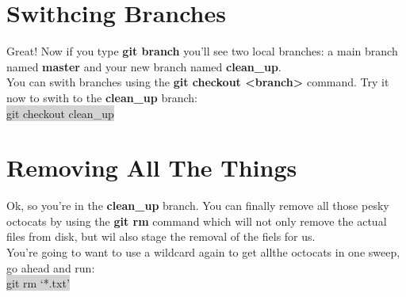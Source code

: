 \documentclass{article}
\begin{document}
\section{Swithcing Branches}
\begin{minipage}[c]{0.66\textwidth}
	\parbox{\textwidth}{
		Great! Now if you type \textbf{git branch} you'll see two local branches: a main branch named \textbf{master} and your new branch named \textbf{clean\_up}.\\
		You can swith branches using the \textbf{git checkout <branch>} command. Try it now to swith to the \textbf{clean\_up} branch:\\
		\colorbox{lightgray}{git checkout clean\_up}
	}
\end{minipage}
\hfill
\begin{minipage}[c]{0.32\textwidth}
\end{minipage}

\section{Removing All The Things}
\begin{minipage}[c]{0.66\textwidth}
	\parbox{\textwidth}{
		Ok, so you're in the \textbf{clean\_up} branch. You can finally remove all those pesky octocats by using the \textbf{git rm} command which will not only remove the actual files from disk, but wil also stage the removal of the fiels for us. \\
		You're going to want to use a wildcard again to get allthe octocats in one sweep, go ahead and run:\\
		\colorbox{lightgray}{git rm `*.txt'}
	}
\end{minipage}
\hfill
\begin{minipage}[c]{0.32\textwidth}
\end{minipage}
\end{document}
